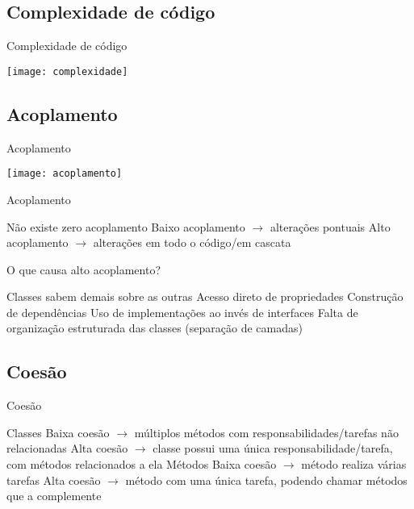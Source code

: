 \documentclass{beamer}
\begin{document}
\subsection{Complexidade de código} %

\begin{frame}{Complexidade de código}
  \begin{center}
    \texttt{[image: complexidade]}
  \end{center}
\end{frame}

\subsection{Acoplamento} %

\begin{frame}{Acoplamento}
  \begin{center}
    \texttt{[image: acoplamento]}
  \end{center}
\end{frame}

\begin{frame}{Acoplamento}
 \begin{outline}
    Não existe zero acoplamento
    Baixo acoplamento $\rightarrow$ alterações pontuais
    Alto acoplamento $\rightarrow$ alterações em todo o código/em cascata
 \end{outline}
\end{frame}

\begin{frame}{O que causa alto acoplamento?}
 \begin{outline}
   Classes sabem \alert{demais} sobre as outras
     Acesso direto de propriedades
     Construção de dependências
     Uso de implementações ao invés de interfaces
   Falta de organização estruturada das classes (separação de camadas)
 \end{outline}
\end{frame}

\subsection{Coesão} %

\begin{frame}{Coesão}
 \begin{outline}
   Classes
     Baixa coesão $\rightarrow$ múltiplos métodos com responsabilidades/tarefas não relacionadas
     Alta coesão $\rightarrow$ classe possui uma única responsabilidade/tarefa, com métodos relacionados a ela
   Métodos
     Baixa coesão $\rightarrow$ método realiza várias tarefas
     Alta coesão $\rightarrow$ método com uma única tarefa, podendo chamar métodos que a complemente
 \end{outline}
\end{frame}
\end{document}
